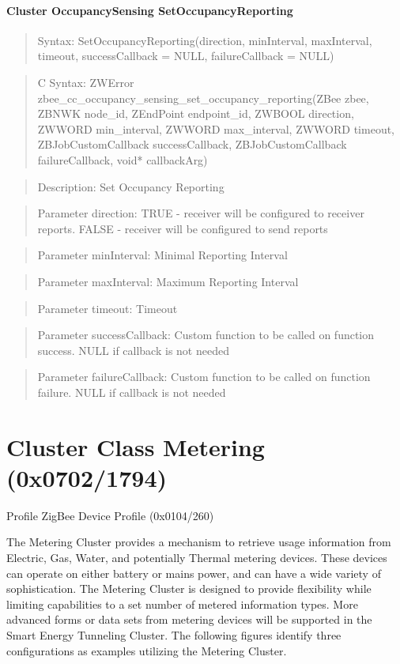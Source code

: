 \paragraph{Cluster OccupancySensing SetOccupancyReporting}
\begin{quote}Syntax: SetOccupancyReporting(direction, minInterval, maxInterval, timeout, successCallback = NULL, failureCallback = NULL)\end{quote}
\begin{quote}C Syntax: ZWError zbee\_cc\_occupancy\_sensing\_set\_occupancy\_reporting(ZBee zbee, ZBNWK node\_id, ZEndPoint endpoint\_id, ZWBOOL direction, ZWWORD min\_interval, ZWWORD max\_interval, ZWWORD timeout, ZBJobCustomCallback successCallback, ZBJobCustomCallback failureCallback, void* callbackArg)\end{quote}
\begin{quote}Description: Set Occupancy Reporting\end{quote}
\begin{quote}Parameter direction: TRUE  - receiver will be configured to receiver reports. FALSE - receiver will be configured to send reports\end{quote}
\begin{quote}Parameter minInterval: Minimal Reporting Interval\end{quote}
\begin{quote}Parameter maxInterval: Maximum Reporting Interval\end{quote}
\begin{quote}Parameter timeout: Timeout\end{quote}
\begin{quote}Parameter successCallback: Custom function to be called on function success. NULL if callback is not needed\end{quote}
\begin{quote}Parameter failureCallback: Custom function to be called on function failure. NULL if callback is not needed\end{quote}



\section{Cluster Class Metering (0x0702/1794)}

Profile ZigBee Device Profile (0x0104/260)

The Metering Cluster provides a mechanism to retrieve usage information from Electric, Gas, Water, and potentially Thermal metering devices. These devices can operate on either battery or mains power, and can have a wide variety of sophistication. The Metering Cluster is designed to provide flexibility while limiting capabilities to a set number of metered information types. More advanced forms or data sets from metering devices will be supported in the Smart Energy Tunneling Cluster. The following figures identify three configurations as examples utilizing the Metering Cluster.
\newline

